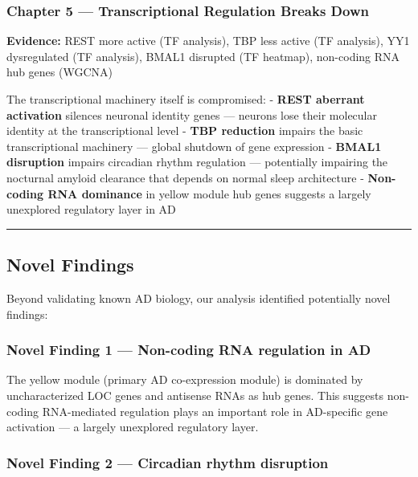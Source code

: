 \documentclass[
]{article}
\begin{document}
\subsubsection{Chapter 5 --- Transcriptional Regulation Breaks
Down}\label{chapter-5-transcriptional-regulation-breaks-down}

\textbf{Evidence:} REST more active (TF analysis), TBP less active (TF
analysis), YY1 dysregulated (TF analysis), BMAL1 disrupted (TF heatmap),
non-coding RNA hub genes (WGCNA)

The transcriptional machinery itself is compromised: - \textbf{REST
aberrant activation} silences neuronal identity genes --- neurons lose
their molecular identity at the transcriptional level - \textbf{TBP
reduction} impairs the basic transcriptional machinery --- global
shutdown of gene expression - \textbf{BMAL1 disruption} impairs
circadian rhythm regulation --- potentially impairing the nocturnal
amyloid clearance that depends on normal sleep architecture -
\textbf{Non-coding RNA dominance} in yellow module hub genes suggests a
largely unexplored regulatory layer in AD

\begin{center}\rule{0.5\linewidth}{0.5pt}\end{center}

\subsection{Novel Findings}\label{novel-findings}

Beyond validating known AD biology, our analysis identified potentially
novel findings:

\subsubsection{Novel Finding 1 --- Non-coding RNA regulation in
AD}\label{novel-finding-1-non-coding-rna-regulation-in-ad}

The yellow module (primary AD co-expression module) is dominated by
uncharacterized LOC genes and antisense RNAs as hub genes. This suggests
non-coding RNA-mediated regulation plays an important role in
AD-specific gene activation --- a largely unexplored regulatory layer.

\subsubsection{Novel Finding 2 --- Circadian rhythm
disruption}\label{novel-finding-2-circadian-rhythm-disruption}
\end{document}
